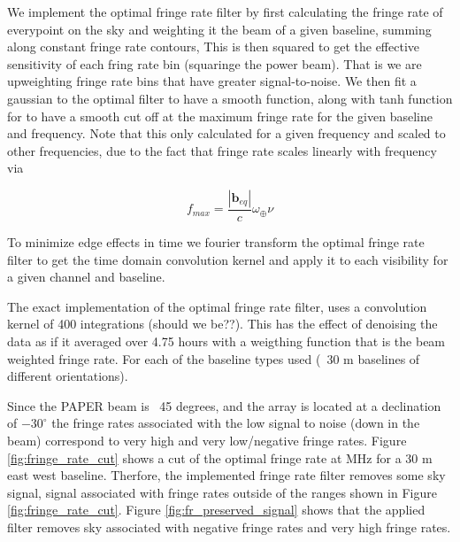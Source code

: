 \documentclass[twocolumn,numberedappendix]{emulateapj}
\begin{document}
We implement the optimal fringe rate filter by first calculating the fringe rate
of everypoint on the sky and weighting it the beam of a given baseline, summing
along constant fringe rate contours, This is then squared to get the effective
sensitivity of each fring rate bin (squaringe the power beam). That is we are
upweighting fringe rate bins that have greater signal-to-noise.  We then fit a
gaussian to the optimal filter to have a smooth function, along with tanh
function for to have a smooth cut off at the maximum fringe rate for the given
baseline and frequency.  Note that this only calculated for a given frequency
and scaled to other frequencies, due to the fact that fringe rate scales
linearly with frequency via

\begin{equation}
    f_{max} = \frac{|\mathbf{b}_{eq}|}{c}\omega_{\oplus}\nu
\end{equation}


To minimize edge effects in time we fourier transform the optimal fringe rate
filter to get the time domain convolution kernel and apply it to each visibility for a
given channel and baseline. 

The exact implementation of the optimal fringe rate filter, uses a convolution
kernel of 400 integrations (should we be??). This has the effect of denoising the data as if it
averaged over 4.75 hours with a weigthing function that is the beam weighted
fringe rate. For each of the baseline types used (~30 m baselines of different
orientations).

Since the PAPER beam is ~45 degrees, and the array is located at a declination
of $-30^{\circ}$ the fringe rates associated with the low signal to noise (down
in the beam) correspond to very high and very low/negative fringe rates. Figure
\ref{fig:fringe_rate_cut} shows a cut of the optimal fringe rate at MHz for a 30
m east west baseline. Therfore, the implemented fringe rate filter removes some
sky signal, signal associated with fringe rates outside of the ranges shown in
Figure \ref{fig:fringe_rate_cut}. Figure \ref{fig:fr_preserved_signal} shows
that the applied filter removes sky associated with negative fringe rates and
very high fringe rates. 
\end{document}
